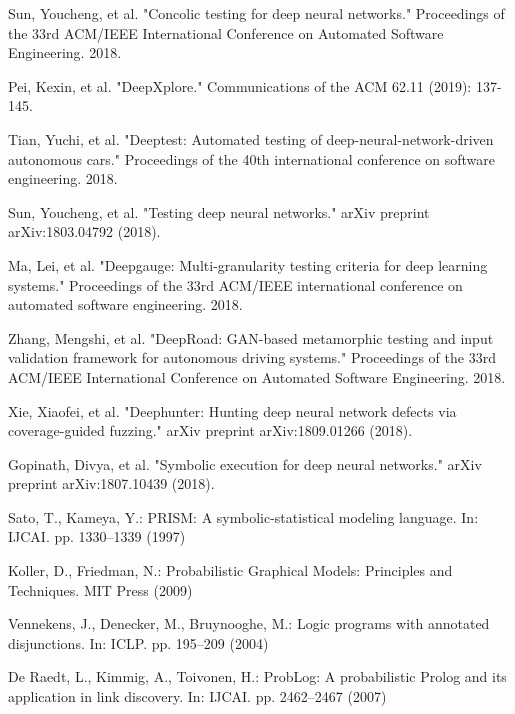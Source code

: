 \begin{singlespace}
\begin{thebibliography}{}
 Sun, Youcheng, et al. "Concolic testing for deep neural networks." Proceedings of the 33rd ACM/IEEE International Conference on Automated Software Engineering. 2018.

 Pei, Kexin, et al. "DeepXplore." Communications of the ACM 62.11 (2019): 137-145.

 Tian, Yuchi, et al. "Deeptest: Automated testing of deep-neural-network-driven autonomous cars." Proceedings of the 40th international conference on software engineering. 2018.

 Sun, Youcheng, et al. "Testing deep neural networks." arXiv preprint arXiv:1803.04792 (2018).

 Ma, Lei, et al. "Deepgauge: Multi-granularity testing criteria for deep learning systems." Proceedings of the 33rd ACM/IEEE international conference on automated software engineering. 2018.

 Zhang, Mengshi, et al. "DeepRoad: GAN-based metamorphic testing and input validation framework for autonomous driving systems." Proceedings of the 33rd ACM/IEEE International Conference on Automated Software Engineering. 2018.

 Xie, Xiaofei, et al. "Deephunter: Hunting deep neural network defects via coverage-guided fuzzing." arXiv preprint arXiv:1809.01266 (2018).

	Gopinath, Divya, et al. "Symbolic execution for deep neural networks." arXiv preprint arXiv:1807.10439 (2018).


 Sato, T., Kameya, Y.: PRISM: A symbolic-statistical modeling language. In: IJCAI. pp. 1330--1339 (1997)

 Koller, D., Friedman, N.: Probabilistic Graphical Models: Principles and Techniques. MIT Press (2009)

 Vennekens, J., Denecker, M., Bruynooghe, M.: Logic programs with annotated disjunctions. In: ICLP. pp. 195--209 (2004)

 De Raedt, L., Kimmig, A., Toivonen, H.: ProbLog: A probabilistic Prolog and its application in link discovery. In: IJCAI. pp. 2462--2467 (2007)


\end{thebibliography}
\end{singlespace}
